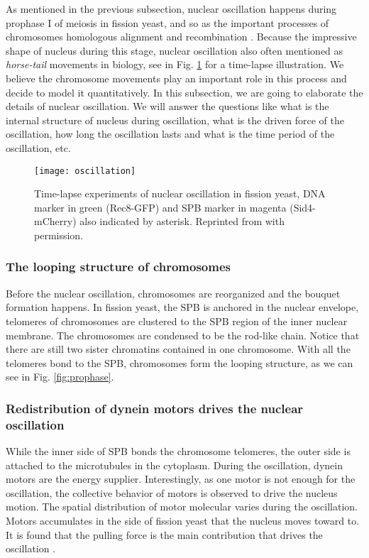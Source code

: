 As mentioned in the previous subsection, nuclear oscillation happens during prophase I of meiosis in fission yeast, and so as the important processes of chromosomes homologous alignment and recombination \cite{Ding1998}. Because the impressive shape of nucleus during this stage, nuclear oscillation also often mentioned as \emph{horse-tail} movements in biology\cite{Koszul2009a,Wells2006,Davis2001}, see in Fig. \ref{fig:oscillation} for a time-lapse illustration. We believe the chromosome movements play an important role in this process and decide to model it quantitatively. In this subsection, we are going to elaborate the details of nuclear oscillation. We will answer the questions like what is the internal structure of nucleus during oscillation, what is the driven force of the oscillation, how long the oscillation lasts and what is the time period of the oscillation, etc.
\begin{figure}[htpb]
    \centering
    \texttt{[image: oscillation]}
    \caption{Time-lapse experiments of nuclear oscillation in fission yeast, DNA marker in green (Rec8-GFP) and SPB marker in magenta (Sid4-mCherry) also indicated by asterisk. Reprinted from \cite{Chacon2016} with permission.}
    \label{fig:oscillation}
\end{figure}

\subsubsection{The looping structure of chromosomes}
Before the nuclear oscillation, chromosomes are reorganized and the bouquet formation happens. In fission yeast, the SPB is anchored in the nuclear envelope, telomeres of chromosomes are clustered to the SPB region of the inner nuclear membrane. The chromosomes are condensed to be the rod-like chain. Notice that there are still two sister chromatins contained in one chromosome. With all the telomeres bond to the SPB, chromosomes form the looping structure, as we can see in Fig. \ref{fig:prophase}. 

\subsubsection{Redistribution of dynein motors drives the nuclear oscillation}
While the inner side of SPB bonds the chromosome telomeres, the outer side is attached to the microtubules in the cytoplasm. During the oscillation, dynein motors are the energy supplier. Interestingly, as one motor is not enough for the oscillation, the collective behavior of motors is observed to drive the nucleus motion. The spatial distribution of motor molecular varies during the oscillation. Motors accumulates in the side of fission yeast that the nucleus moves toward to. It is found that the pulling force is the main contribution that drives the oscillation \cite{Vogel2009}.

